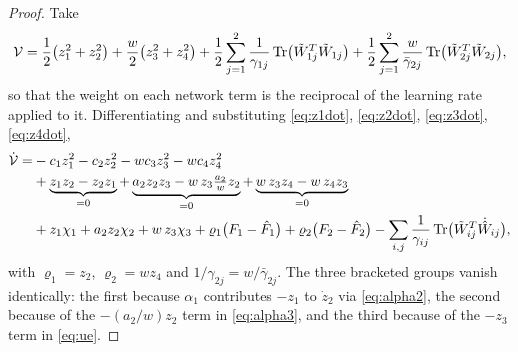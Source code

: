 \begin{proof}
Take
\begin{equation}\label{eq:Vctrl}
\mathcal{V}=\frac{1}{2}\bigl(z_1^2+z_2^2\bigr)+\frac{w}{2}\bigl(z_3^2+z_4^2\bigr)
+\frac{1}{2}\sum_{j=1}^{2}\frac{1}{\gamma_{1j}}\operatorname{Tr}\bigl(\tilde{W}_{1j}^T\tilde{W}_{1j}\bigr)
+\frac{1}{2}\sum_{j=1}^{2}\frac{w}{\bar\gamma_{2j}}\operatorname{Tr}\bigl(\tilde{W}_{2j}^T\tilde{W}_{2j}\bigr),
\end{equation}
so that the weight on each network term is the reciprocal of the learning rate
applied to it. Differentiating and substituting
\eqref{eq:z1dot}, \eqref{eq:z2dot}, \eqref{eq:z3dot}, \eqref{eq:z4dot},
\[
\begin{aligned}
\dot{\mathcal{V}}=&-c_1z_1^2-c_2z_2^2-wc_3z_3^2-wc_4z_4^2\\
&+\underbrace{z_1z_2-z_2z_1}_{=0}
+\underbrace{a_2z_2z_3-w\,z_3\tfrac{a_2}{w}z_2}_{=0}
+\underbrace{w\,z_3z_4-w\,z_4z_3}_{=0}\\
&+z_1\chi_1+a_2z_2\chi_2+w\,z_3\chi_3
+\varrho_1\bigl(F_1-\hat F_1\bigr)+\varrho_2\bigl(F_2-\hat F_2\bigr)
-\sum_{i,j}\frac{1}{\gamma_{ij}}\operatorname{Tr}\bigl(\tilde{W}_{ij}^T\dot{\hat{W}}_{ij}\bigr),
\end{aligned}
\]
with $\varrho_1=z_2$, $\varrho_2=wz_4$ and $1/\gamma_{2j}=w/\bar\gamma_{2j}$.
The three bracketed groups vanish identically: the first because $\alpha_1$
contributes $-z_1$ to $\dot z_2$ via \eqref{eq:alpha2}, the second because of
the $-(a_2/w)z_2$ term in \eqref{eq:alpha3}, and the third because of the
$-z_3$ term in \eqref{eq:ue}.


\end{proof}

